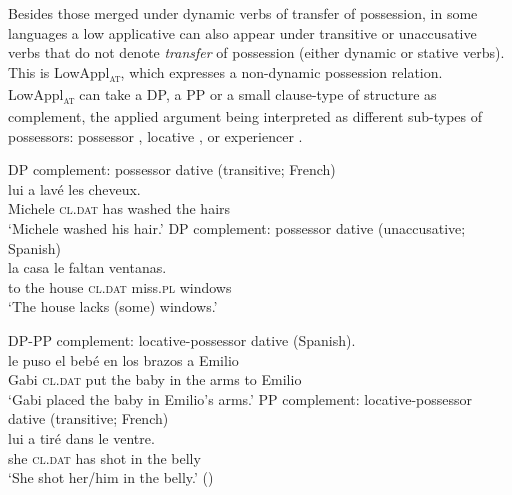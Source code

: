 \documentclass[output=paper,colorlinks,citecolor=brown,nonflat]{./langscibook}
\begin{document}
Besides those merged under dynamic verbs of transfer of possession, in some languages a low applicative can also appear under transitive or unaccusative verbs that do not denote \textit{transfer} of possession (either dynamic or stative verbs). This is  LowAppl\textsc{\textsubscript{at}}, which expresses a non-dynamic possession relation. LowAppl\textsc{\textsubscript{at}} can take  a DP, a PP or a small clause-type of structure as complement, the applied argument being interpreted as different sub-types of possessors: possessor , locative , or experiencer . 

\ea%
    \label{ex:cuervo:6}
    \ea%
        \label{ex:cuervo:6a}
        DP complement: possessor dative (transitive; French)\\
         {lui} {a} {lavé} {les} {cheveux}.\\
        Michele \textsc{cl.dat} has washed the hairs\\
        \glt ‘Michele washed his hair.’
    \ex%
        \label{ex:cuervo:6b}
        DP complement: possessor dative (unaccusative; Spanish)\\
         {la} {casa} {le} {faltan} {ventanas}.\\
        {to} the house \textsc{cl.dat} miss.\textsc{pl} windows\\
        \glt ‘The house lacks (some) windows.’
    \z
\z

\ea%
    \label{ex:cuervo:7}
    \ea%
        \label{ex:cuervo:7a}
        DP-PP complement: locative-possessor dative (Spanish).\\
         {le} {puso} {el} {bebé}  {en} {los} {brazos} {a} {Emilio}\\
        Gabi \textsc{cl.dat} put the baby in the arms {to} Emilio \\
        \glt ‘Gabi placed the baby in Emilio’s arms.’
    \ex%
        \label{ex:cuervo:7b}
        PP complement: locative-possessor dative (transitive; French)\\
         {lui} {a} {tiré} {dans} {le} {ventre}.\\
        she \textsc{cl.dat} has shot in the belly\\
        \glt ‘She shot her/him in the belly.’  (\citealt{BonehNash2012})
    \z
\z
\end{document}
